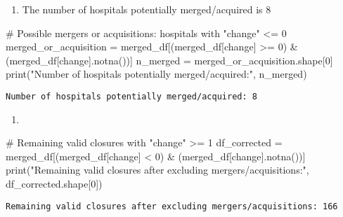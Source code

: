 \documentclass[
  letterpaper,
  DIV=11,
  numbers=noendperiod]{scrartcl}
\newenvironment{Shaded}{\begin{snugshade}}{\end{snugshade}}
\newcommand{\BuiltInTok}[1]{\textcolor[rgb]{0.00,0.23,0.31}{#1}}
\newcommand{\CommentTok}[1]{\textcolor[rgb]{0.37,0.37,0.37}{#1}}
\newcommand{\DecValTok}[1]{\textcolor[rgb]{0.68,0.00,0.00}{#1}}
\newcommand{\NormalTok}[1]{\textcolor[rgb]{0.00,0.23,0.31}{#1}}
\newcommand{\OperatorTok}[1]{\textcolor[rgb]{0.37,0.37,0.37}{#1}}
\newcommand{\StringTok}[1]{\textcolor[rgb]{0.13,0.47,0.30}{#1}}
\providecommand{\tightlist}{%
  \setlength{\itemsep}{0pt}\setlength{\parskip}{0pt}}\usepackage{longtable,booktabs,array}
\begin{document}
\begin{enumerate}
\def\labelenumi{\alph{enumi}.}
\tightlist
\item
  The number of hospitals potentially merged/acquired is 8
\end{enumerate}

\begin{Shaded}
\begin{Highlighting}[]
\CommentTok{\# Possible mergers or acquisitions: hospitals with "change" \textless{}= 0}
\NormalTok{merged\_or\_acquisition }\OperatorTok{=}\NormalTok{ merged\_df[(merged\_df[}\StringTok{\textquotesingle{}change\textquotesingle{}}\NormalTok{] }\OperatorTok{\textgreater{}=} \DecValTok{0}\NormalTok{) }\OperatorTok{\&}\NormalTok{ (merged\_df[}\StringTok{\textquotesingle{}change\textquotesingle{}}\NormalTok{].notna())]}
\NormalTok{n\_merged }\OperatorTok{=}\NormalTok{ merged\_or\_acquisition.shape[}\DecValTok{0}\NormalTok{]}
\BuiltInTok{print}\NormalTok{(}\StringTok{"Number of hospitals potentially merged/acquired:"}\NormalTok{, n\_merged)}
\end{Highlighting}
\end{Shaded}

\begin{verbatim}
Number of hospitals potentially merged/acquired: 8
\end{verbatim}

\begin{enumerate}
\def\labelenumi{\alph{enumi}.}
\setcounter{enumi}{1}
\tightlist
\item
\end{enumerate}

\begin{Shaded}
\begin{Highlighting}[]
\CommentTok{\# Remaining valid closures with "change" \textgreater{}= 1}
\NormalTok{df\_corrected }\OperatorTok{=}\NormalTok{ merged\_df[(merged\_df[}\StringTok{\textquotesingle{}change\textquotesingle{}}\NormalTok{] }\OperatorTok{\textless{}} \DecValTok{0}\NormalTok{) }\OperatorTok{\&}\NormalTok{ (merged\_df[}\StringTok{\textquotesingle{}change\textquotesingle{}}\NormalTok{].notna())]}
\BuiltInTok{print}\NormalTok{(}\StringTok{"Remaining valid closures after excluding mergers/acquisitions:"}\NormalTok{, df\_corrected.shape[}\DecValTok{0}\NormalTok{])}
\end{Highlighting}
\end{Shaded}

\begin{verbatim}
Remaining valid closures after excluding mergers/acquisitions: 166
\end{verbatim}
\end{document}
